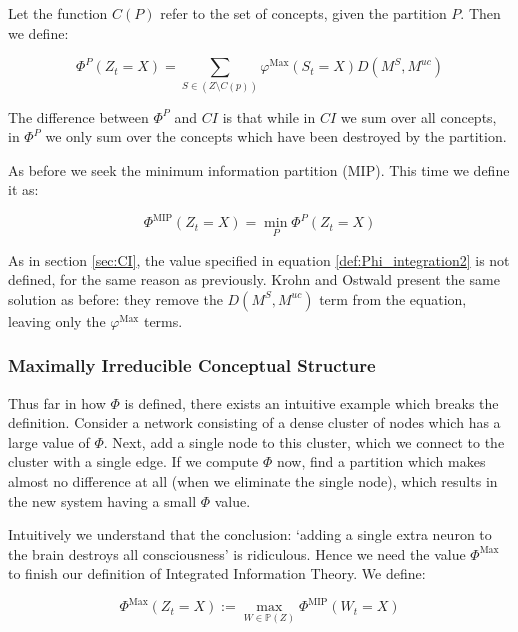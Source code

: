 Let the function $C(P)$ refer to the set of concepts, given the partition $P$. Then we define:

\begin{equation}
\label{def:Phi_integration1}
\Phi^P(Z_t = X) = \sum \limits_{S \in (Z \setminus C(p))} \varphi^{\text{Max}}(S_t = X)D(M^S, M^{uc})
\end{equation}

The difference between $\Phi^P$ and $CI$ is that while in $CI$ we sum over all concepts, in $\Phi^P$ we only sum over the concepts which have been destroyed by the partition.

As before we seek the minimum information partition (MIP). This time we define it as:

\begin{equation}
\label{def:Phi_integration2}
\Phi^{\text{MIP}} (Z_t = X) = \min \limits_{P} \Phi^P(Z_t = X)
\end{equation}

\begin{remark}
	As in section \ref{sec:CI}, the value specified in equation \ref{def:Phi_integration2} is not defined, for the same reason as previously. Krohn and Ostwald present the same solution as before: they remove the $D(M^S, M^{uc})$ term from the equation, leaving only the $\varphi^{\text{Max}}$ terms.
\end{remark}

\subsubsection{Maximally Irreducible Conceptual Structure}

Thus far in how $\Phi$ is defined, there exists an intuitive example which breaks the definition. Consider a network consisting of a dense cluster of nodes which has a large value of $\Phi$. Next, add a single node to this cluster, which we connect to the cluster with a single edge. If we compute $\Phi$ now, find a partition which makes almost no difference at all (when we eliminate the single node), which results in the new system having a small $\Phi$ value. 

Intuitively we understand that the conclusion: `adding a single extra neuron to the brain destroys all consciousness' is ridiculous. Hence we need the value $\Phi^{\text{Max}}$ to finish our definition of Integrated Information Theory. We define:

\begin{equation}
\label{def:Phimax}
\Phi^{\text{Max}}(Z_t = X) := \max \limits_{W \in \mathbb{P}(Z)}\Phi^{\text{MIP}} (W_t = X)
\end{equation}

